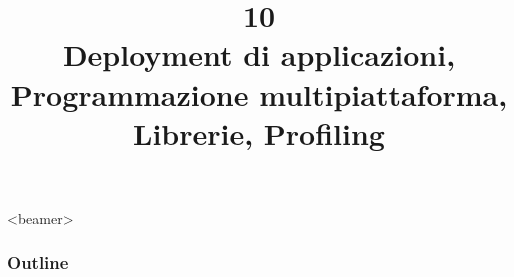 \documentclass[presentation]{beamer}
\title[L10 -- Deployment, Libraries, Multiplatform]{10\\Deployment di applicazioni, Programmazione multipiattaforma, Librerie, Profiling}
\begin{document}
\frame[label=coverpage]{\titlepage}

\begin{frame}<beamer>
 	\frametitle{Outline}
 	\tableofcontents[]
\end{frame}
\end{document}
